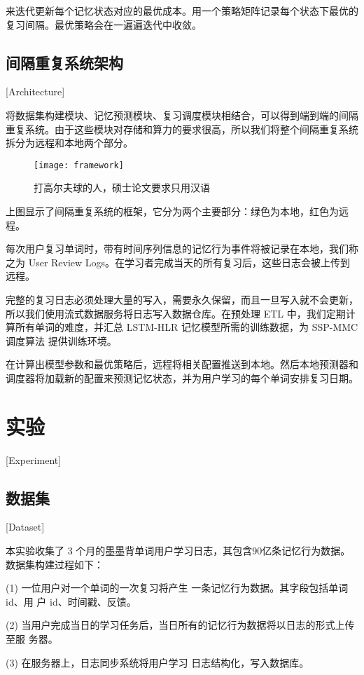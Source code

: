 来迭代更新每个记忆状态对应的最优成本。用一个策略矩阵记录每个状态下最优的复习间隔。最优策略会在一遍遍迭代中收敛。

\section{间隔重复系统架构}[Architecture]

将数据集构建模块、记忆预测模块、复习调度模块相结合，可以得到端到端的间隔重复系统。由于这些模块对存储和算力的要求很高，所以我们将整个间隔重复系统拆分为远程和本地两个部分。

\begin{figure}[htpb]
\centering
\texttt{[image: framework]}
\caption{打高尔夫球的人，硕士论文要求只用汉语}
\end{figure}

上图显示了间隔重复系统的框架，它分为两个主要部分：绿色为本地，红色为远程。

每次用户复习单词时，带有时间序列信息的记忆行为事件将被记录在本地，我们称之为 User Review Logs。在学习者完成当天的所有复习后，这些日志会被上传到远程。

完整的复习日志必须处理大量的写入，需要永久保留，而且一旦写入就不会更新，所以我们使用流式数据服务将日志写入数据仓库。在预处理 ETL 中，我们定期计算所有单词的难度，并汇总 LSTM-HLR 记忆模型所需的训练数据，为 SSP-MMC 调度算法 提供训练环境。

在计算出模型参数和最优策略后，远程将相关配置推送到本地。然后本地预测器和调度器将加载新的配置来预测记忆状态，并为用户学习的每个单词安排复习日期。

\chapter{实验}[Experiment]

\section{数据集}[Dataset]

本实验收集了 3 个月的墨墨背单词用户学习日志，其包含90亿条记忆行为数据。数据集构建过程如下：

(1) 一位用户对一个单词的一次复习将产生 一条记忆行为数据。其字段包括单词 id、用 户 id、时间戳、反馈。

(2) 当用户完成当日的学习任务后，当日所有的记忆行为数据将以日志的形式上传至服 务器。

(3) 在服务器上，日志同步系统将用户学习 日志结构化，写入数据库。

